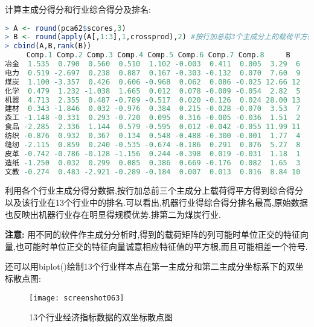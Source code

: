 \documentclass[11pt,a4paper,oneside]{book}
\begin{document}
计算主成分得分和行业综合得分及排名:
\begin{lstlisting}[language=r]
> A <- round(pca62$scores,3) 
> B <- round(apply(A[,1:3],1,crossprod),2) #按行加总前3个主成分上的载荷平方得综合得分
> cbind(A,B,rank(B))
     Comp.1 Comp.2 Comp.3 Comp.4 Comp.5 Comp.6 Comp.7 Comp.8     B   
冶金  1.535  0.790  0.560  0.510  1.102 -0.003  0.411  0.005  3.29  6
电力  0.519 -2.697  0.238  0.887  0.167 -0.303 -0.132  0.070  7.60  9
煤炭  1.100 -3.357  0.426  0.606 -0.968  0.062  0.086 -0.025 12.66 12
化学  0.479  1.232 -1.038  1.665  0.012  0.078 -0.009 -0.054  2.82  5
机器  4.713  2.355  0.487 -0.789 -0.517  0.020 -0.126  0.024 28.00 13
建材  0.343 -1.846  0.032 -0.976  0.384  0.215 -0.028 -0.070  3.53  7
森工 -1.148 -0.331  0.293 -0.720  0.095  0.316 -0.005 -0.036  1.51  2
食品 -2.285  2.336  1.144  0.579 -0.595  0.012 -0.042 -0.055 11.99 11
纺织 -0.876  0.932  0.367  0.134  0.548 -0.488 -0.300 -0.001  1.77  4
缝纫 -2.115  0.859  0.240 -0.535 -0.674 -0.186  0.291  0.076  5.27  8
皮革 -0.742 -0.786 -0.128 -1.156  0.244 -0.398  0.019 -0.031  1.18  1
造纸 -1.250  0.032  0.299  0.085  0.386  0.669 -0.176  0.082  1.65  3
文教 -0.274  0.483 -2.921 -0.289 -0.184  0.007  0.013  0.016  8.84 10
\end{lstlisting}

利用各个行业主成分得分数据,按行加总前三个主成分上载荷得平方得到综合得分以及该行业在13个行业中的排名.可以看出,机器行业得综合得分排名最高,原始数据也反映出机器行业存在明显得规模优势.排第二为煤炭行业.

\begin{tcolorbox}[colback=blue!7!white,colframe=blue!40]
	\textbf{注意:} 用不同的软件作主成分分析时,得到的载荷矩阵的列可能时单位正交的特征向量,也可能时单位正交的特征向量诚意相应特征值的平方根,而且可能相差一个符号.
\end{tcolorbox}

还可以用biplot()绘制13个行业样本点在第一主成分和第二主成分坐标系下的双坐标散点图:
\begin{figure}[H]
	\centering
	\texttt{[image: screenshot063]}
	\caption{13个行业经济指标数据的双坐标散点图}
	\label{fig:screenshot063}
\end{figure}
\end{document}
